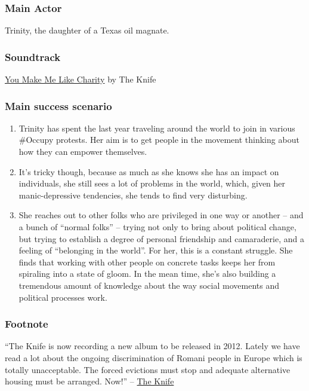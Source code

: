 \subsubsection{Main Actor}

Trinity, the daughter of a Texas oil magnate.

\subsubsection{Soundtrack}

\href{http://www.youtube.com/watch?v=NWsX9ggfL2Q}{You Make Me Like
Charity} by The Knife

\subsubsection{Main success scenario}

\begin{enumerate}
\item
  Trinity has spent the last year traveling around the world to join in
  various \#Occupy protests. Her aim is to get people in the movement
  thinking about how they can empower themselves.
\item
  It's tricky though, because as much as she knows she has an impact on
  individuals, she still sees a lot of problems in the world, which,
  given her manic-depressive tendencies, she tends to find very
  disturbing.
\item
  She reaches out to other folks who are privileged in one way or
  another -- and a bunch of ``normal folks'' -- trying not only to bring
  about political change, but trying to establish a degree of personal
  friendship and camaraderie, and a feeling of ``belonging in the
  world''. For her, this is a constant struggle. She finds that working
  with other people on concrete tasks keeps her from spiraling into a
  state of gloom. In the mean time, she's also building a tremendous
  amount of knowledge about the way social movements and political
  processes work.
\end{enumerate}
\subsubsection{Footnote}

``The Knife is now recording a new album to be released in 2012. Lately
we have read a lot about the ongoing discrimination of Romani people in
Europe which is totally unacceptable. The forced evictions must stop and
adequate alternative housing must be arranged. Now!'' --
\href{http://theknife.net/take-action-for-the-housing-rights-of-roma-in-rome}{The
Knife}
